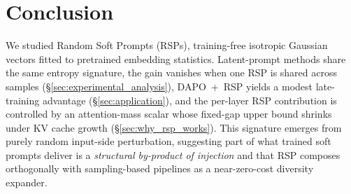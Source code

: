 
\section{Conclusion}\label{sec:conclusion}

We studied Random Soft Prompts (RSPs), training-free isotropic Gaussian vectors fitted to pretrained embedding statistics. Latent-prompt methods share the same entropy signature, the gain vanishes when one RSP is shared across samples (\S\ref{sec:experimental_analysis}), DAPO~+~RSP yields a modest late-training advantage (\S\ref{sec:application}), and the per-layer RSP contribution is controlled by an attention-mass scalar whose fixed-gap upper bound shrinks under KV cache growth (\S\ref{sec:why_rsp_works}). This signature emerges from purely random input-side perturbation, suggesting part of what trained soft prompts deliver is a \emph{structural by-product of injection} and that RSP composes orthogonally with sampling-based pipelines as a near-zero-cost diversity expander.
